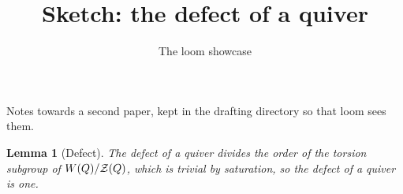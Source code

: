 \documentclass{amsart}
\title{Sketch: the defect of a quiver}
\author{The loom showcase}
\theoremstyle{plain}
\newtheorem{lemma}{Lemma}
\begin{document}
\maketitle

Notes towards a second paper, kept in the drafting directory so that loom sees them.

\begin{lemma}[Defect]\label{sh-0020}
The defect of a quiver divides the order of the torsion subgroup of $W(Q) / \mathcal{Z}(Q)$, which is trivial by saturation, so the defect of a quiver is one.
\end{lemma}
\end{document}
